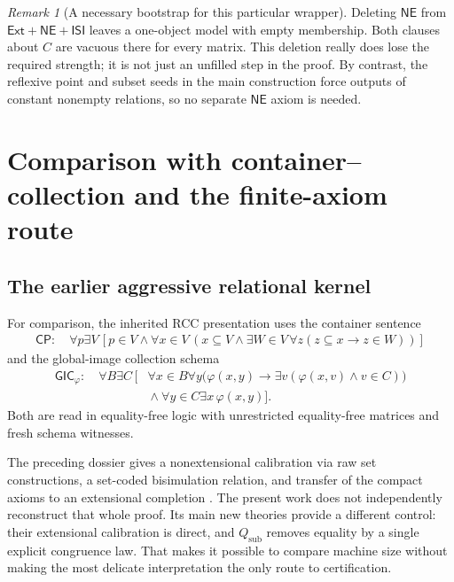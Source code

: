 \documentclass[11pt,letterpaper]{article}
\theoremstyle{definition}\newtheorem{definition}[theorem]{Definition}
\theoremstyle{remark}\newtheorem{remark}[theorem]{Remark}
\newcommand{\Ext}{\mathsf{Ext}}
\newcommand{\ISI}{\mathsf{ISI}}
\newcommand{\NE}{\mathsf{NE}}
\newcommand{\CP}{\mathsf{CP}}
\newcommand{\GIC}{\mathsf{GIC}}
\newcommand{\QTsub}{Q_{\mathrm{sub}}}
\begin{document}
\begin{remark}[A necessary bootstrap for this particular wrapper]
Deleting $\NE$ from $\Ext+\NE+\ISI$ leaves a one-object model with empty
membership. Both clauses about $C$ are vacuous there for every matrix.
This deletion really does lose the required strength; it is not just an
unfilled step in the proof. By contrast, the reflexive point and subset
seeds in the main construction force outputs of constant nonempty
relations, so no separate $\NE$ axiom is needed.
\end{remark}

\section{Comparison with container--collection and the finite-axiom route}
\label{sec:competitors}

\subsection{The earlier aggressive relational kernel}

For comparison, the inherited RCC presentation uses the container sentence
\begin{equation}\label{eq:CP}
\begin{split}
 \CP:\quad\forall p\exists V\,[p\in V\land\forall x\in V\,(
 x\subseteq V\land\exists W\in V\,
          \forall z(z\subseteq x\to z\in W))]
\end{split}
\end{equation}
and the global-image collection schema
\begin{equation}\label{eq:GIC}
\begin{split}
 \GIC_\varphi:\quad\forall B\exists C\,[{}&
 \forall x\in B\forall y\bigl(\varphi(x,y)\to
         \exists v(\varphi(x,v)\land v\in C)\bigr)\\
 &{}\land\forall y\in C\exists x\,\varphi(x,y)].
\end{split}
\end{equation}
Both are read in equality-free logic with unrestricted equality-free
matrices and fresh schema witnesses.

The preceding dossier gives a nonextensional calibration via raw set
constructions, a set-coded bisimulation relation, and transfer of the
compact axioms to an extensional completion \cite{prior2,prior3}.
The present work does not independently reconstruct that whole proof.
Its main new theories provide a different control: their extensional
calibration is direct, and $\QTsub$ removes equality by a single explicit
congruence law. That makes it possible to compare machine size without
making the most delicate interpretation the only route to certification.
\end{document}
